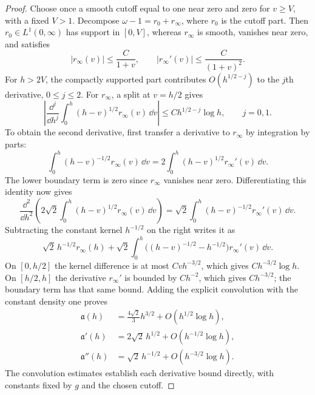 \begin{proof}
Choose once a smooth cutoff equal to one near zero and zero for
$v\geq V$, with a fixed $V>1$. Decompose
$\omega-1=r_0+r_\infty$, where $r_0$ is the cutoff part. Then
$r_0\in L^1(0,\infty)$ has support in $[0,V]$, whereas
$r_\infty$ is smooth, vanishes near zero, and satisfies
\[
 |r_\infty(v)|\leq\frac{C}{1+v},\qquad
 |r_\infty'(v)|\leq\frac{C}{(1+v)^2}.
\]
For $h>2V$, the compactly supported part contributes
$O(h^{1/2-j})$ to the $j$th derivative, $0\le j\le2$.
For $r_\infty$, a split at $v=h/2$ gives
\[
 \left|\frac{\dd^j}{\dd h^j}
       \int_0^h(h-v)^{1/2}r_\infty(v)\,\dd v\right|
       \leq Ch^{1/2-j}\log h,\qquad j=0,1.
\]
To obtain the second derivative, first transfer a derivative to
$r_\infty$ by integration by parts:
\[
 \int_0^h(h-v)^{-1/2}r_\infty(v)\,\dd v
 =2\int_0^h(h-v)^{1/2}r_\infty'(v)\,\dd v.
\]
The lower boundary term is zero since $r_\infty$ vanishes near
zero. Differentiating this identity now gives
\[
 \frac{\dd^2}{\dd h^2}
 \left(2\sqrt2\int_0^h(h-v)^{1/2}r_\infty(v)\,\dd v\right)
 =\sqrt2\int_0^h(h-v)^{-1/2}r_\infty'(v)\,\dd v.
\]
Subtracting the constant kernel $h^{-1/2}$ on the right writes it as
\[
 \sqrt2\,h^{-1/2}r_\infty(h)
 +\sqrt2\int_0^h\bigl((h-v)^{-1/2}-h^{-1/2}\bigr)
                      r_\infty'(v)\,\dd v.
\]
On $[0,h/2]$ the kernel difference is at most $Cvh^{-3/2}$,
which gives $Ch^{-3/2}\log h$. On $[h/2,h]$ the derivative
$r_\infty'$ is bounded by $Ch^{-2}$, which gives $Ch^{-3/2}$;
the boundary term has that same bound. Adding the explicit
convolution with the constant density one proves
\begin{equation}\label{rw:ect-area-tail}
 \begin{aligned}
 \mathfrak a(h)&=\frac{4\sqrt2}{3}h^{3/2}
                    +O(h^{1/2}\log h),\\
 \mathfrak a'(h)&=2\sqrt2\,h^{1/2}
                    +O(h^{-1/2}\log h),\\
 \mathfrak a''(h)&=\sqrt2\,h^{-1/2}
                    +O(h^{-3/2}\log h).
 \end{aligned}
\end{equation}
The convolution estimates establish each derivative bound directly,
with constants fixed by $g$ and the chosen cutoff.


\end{proof}
